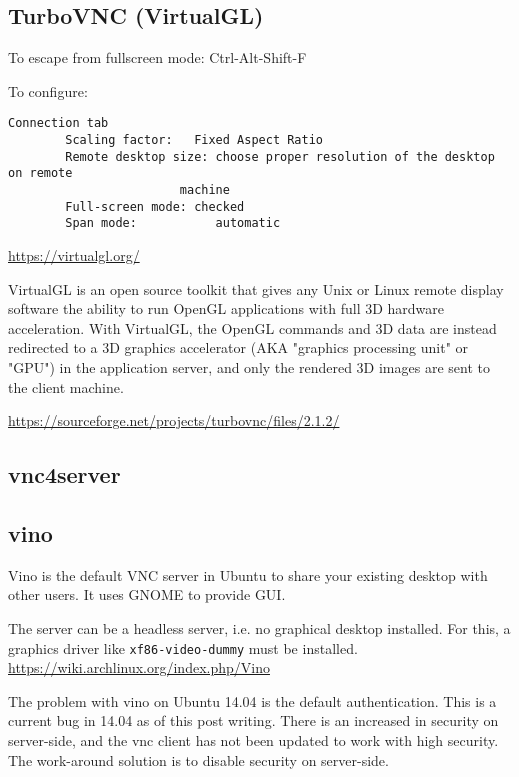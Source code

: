 \subsection{TurboVNC (VirtualGL)}
\label{sec:TurboVNC}

To escape from fullscreen mode: Ctrl-Alt-Shift-F

To configure:
\begin{verbatim}
Connection tab
        Scaling factor:   Fixed Aspect Ratio
        Remote desktop size: choose proper resolution of the desktop on remote
                        machine
        Full-screen mode: checked
        Span mode:           automatic
\end{verbatim}

\url{https://virtualgl.org/}

VirtualGL is an open source toolkit that gives any Unix or Linux remote display
software the ability to run OpenGL applications with full 3D hardware
acceleration.
With VirtualGL, the OpenGL commands and 3D data are instead redirected to a 3D
graphics accelerator (AKA "graphics processing unit" or "GPU") in the
application server, and only the rendered 3D images are sent to the client
machine.

\url{https://sourceforge.net/projects/turbovnc/files/2.1.2/}

\subsection{vnc4server}
\label{sec:vnc4server}

\subsection{vino}
\label{sec:vino}

Vino is the default VNC server in Ubuntu to share your existing desktop with
other users. It uses GNOME to provide GUI.

The server can be a headless server, i.e. no graphical desktop installed. For
this, a graphics driver like \verb!xf86-video-dummy! must be installed.
\url{https://wiki.archlinux.org/index.php/Vino}


The problem with vino on Ubuntu 14.04 is the default authentication. This is a
current bug in 14.04 as of this post writing. There is an increased in 
security on server-side, and the vnc client has not been updated to work with
high security. The work-around solution is to disable security on server-side.

